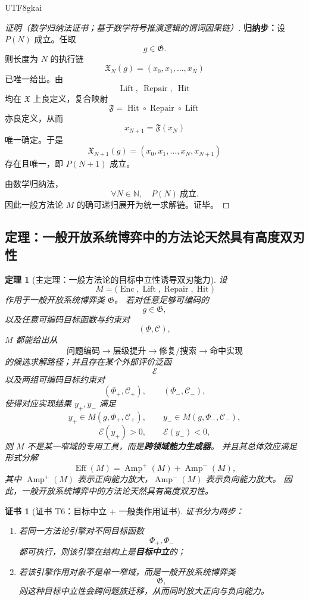 \documentclass[12pt]{article}
\newtheorem{theorem}{定理}[section]
\newtheorem{Certificate}{证书}[section]
\newcommand{\NN}{\mathbb{N}}
\begin{document}
\begin{CJK*}{UTF8}{gkai}
\begin{proof}[证明（数学归纳法证书；基于数学符号推演逻辑的谓词因果链）]
\textbf{归纳步：}设 $P(N)$ 成立。任取
\[
  g\in \mathfrak G.
\]
则长度为 $N$ 的执行链
\[
  \mathfrak X_N(g)
  =
  (x_0,x_1,\ldots,x_N)
\]
已唯一给出。由
\[
  \operatorname{Lift},\ \operatorname{Repair},\ \operatorname{Hit}
\]
均在 $\mathfrak X$ 上良定义，复合映射
\[
  \mathfrak F=\operatorname{Hit}\circ \operatorname{Repair}\circ \operatorname{Lift}
\]
亦良定义，从而
\[
  x_{N+1}
  =
  \mathfrak F(x_N)
\]
唯一确定。于是
\[
  \mathfrak X_{N+1}(g)
  =
  (x_0,x_1,\ldots,x_N,x_{N+1})
\]
存在且唯一，即 $P(N+1)$ 成立。

由数学归纳法，
\[
  \forall N\in\NN,\quad P(N)\ \text{成立}.
\]
因此一般方法论 $M$ 的确可递归展开为统一求解链。证毕。
\end{proof}

\subsection{定理：一般开放系统博弈中的方法论天然具有高度双刃性}
\label{subsec:tex36-general-dual-edge}

\begin{theorem}[主定理：一般方法论的目标中立性诱导双刃能力]
\label{thm:tex36-general-dual-edge}
设
\[
  M
  =
  \bigl(
    \operatorname{Enc},
    \operatorname{Lift},
    \operatorname{Repair},
    \operatorname{Hit}
  \bigr)
\]
作用于一般开放系统博弈类 $\mathfrak G$。
若对任意足够可编码的
\[
  g\in \mathfrak G,
\]
以及任意可编码目标函数与约束对
\[
  (\Phi,\mathcal C),
\]
$M$ 都能给出从
\[
  \text{问题编码}
  \to
  \text{层级提升}
  \to
  \text{修复/搜索}
  \to
  \text{命中实现}
\]
的候选求解路径；并且存在某个外部评价泛函
\[
  \mathcal E
\]
以及两组可编码目标约束对
\[
  (\Phi_{+},\mathcal C_{+}),
  \qquad
  (\Phi_{-},\mathcal C_{-}),
\]
使得对应实现结果 $y_{+},y_{-}$ 满足
\[
  y_{+}\in M(g,\Phi_{+},\mathcal C_{+}),
  \qquad
  y_{-}\in M(g,\Phi_{-},\mathcal C_{-}),
\]
\[
  \mathcal E(y_{+})>0,
  \qquad
  \mathcal E(y_{-})<0,
\]
则 $M$ 不是某一窄域的专用工具，而是\textbf{跨领域能力生成器}。
并且其总体效应满足形式分解
\[
  \operatorname{Eff}(M)
  =
  \operatorname{Amp}^{+}(M)
  +
  \operatorname{Amp}^{-}(M),
\]
其中 $\operatorname{Amp}^{+}(M)$ 表示正向能力放大，$\operatorname{Amp}^{-}(M)$ 表示负向能力放大。
因此，一般开放系统博弈中的方法论天然具有高度双刃性。
\end{theorem}

\begin{Certificate}[证书 T6：目标中立 + 一般类作用证书]
\label{cert:tex36-t6}
证书分为两步：
\begin{enumerate}
  \item 若同一方法论引擎对不同目标函数
  \[
    \Phi_{+},\Phi_{-}
  \]
  都可执行，则该引擎在结构上是\textbf{目标中立}的；
  \item 若该引擎作用对象不是单一窄域，而是一般开放系统博弈类
  \[
    \mathfrak G,
  \]
  则这种目标中立性会跨问题族迁移，从而同时放大正向与负向能力。
\end{enumerate}
\end{Certificate}


\end{CJK*}
\end{document}
